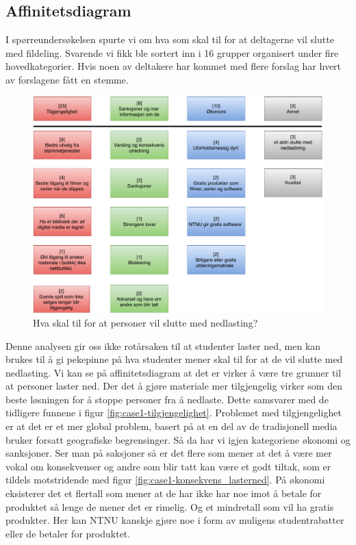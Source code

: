 \subsection{Affinitetsdiagram}
I spørreundersøkelsen spurte vi om hva som skal til for at deltagerne vil slutte med fildeling. Svarende vi fikk ble sortert inn i 16 grupper organisert under fire hovedkategorier. Hvis noen av deltakere har kommet med flere forslag har hvert av forslagene fått en stemme.  

\begin{figure}[H]
    \centering
    \includegraphics[scale=0.6]{case_1/bilder/stoppe_nedlastning.pdf}
    \caption[Slutte med nedlasting]{Hva skal til for at personer vil slutte med nedlasting?}
    \label{fig:case1-stoppe_nedlastning}
\end{figure}

Denne analysen gir oss ikke rotårsaken til at studenter laster ned, men kan brukes til å gi pekepinne på hva studenter mener skal til for at de vil slutte med nedlasting. Vi kan se på affinitetsdiagram at det er virker å være tre grunner til at personer laster ned. Der det å gjøre materiale mer tilgjengelig virker som den beste løsningen for å stoppe personer fra å nedlaste. Dette samsvarer med de tidligere funnene i figur \ref{fig:case1-tilgjengelighet}. Problemet med tilgjengelighet er at det er et mer global problem, basert på at en del av de tradisjonell media bruker forsatt geografiske begrensinger. Så da har vi igjen kategoriene økonomi og sanksjoner. Ser man på saksjoner så er det flere som mener at det å være mer vokal om konsekvenser og andre som blir tatt kan være et godt tiltak, som er tildels motstridende med figur \ref{fig:case1-konsekvens_lasterned}. På økonomi eksisterer det et flertall som mener at de har ikke har noe imot å betale for produktet så lenge de mener det er rimelig. Og et mindretall som vil ha gratis produkter. Her kan NTNU kanskje gjøre noe i form av muligens studentrabatter eller de betaler for produktet.

